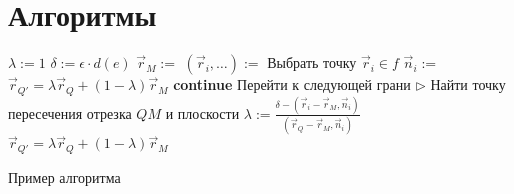 \chapter{Алгоритмы}

\begin{algorithm}[ht!]
\centering
\begin{algorithmic}[1]
\State $\lambda := 1$
\State $\delta := \epsilon \cdot d(e)$
\State $\vec r_M := $ 
\State $(\vec r_i, \dots) := $ 
\Comment Выбрать точку $\vec r_i \in f$
\State $\vec n_i := $ 
\State $\vec r_{Q'} = \lambda \vec r_Q + (1 - \lambda) \vec r_{M}$
\State \textbf{continue} \Comment Перейти к следующей грани
\Else
\State $\triangleright$ Найти точку пересечения отрезка $QM$ и плоскости
\State $\lambda := \frac{\delta - (\vec r_i - \vec r_M, \vec n_i)}
{(\vec r_Q - \vec r_M, \vec n_i)}$
\EndIf
\EndFor
\State $\vec r_{Q'} = \lambda \vec r_Q + (1 - \lambda) \vec r_{M}$
\State{}
\EndFunction
\end{algorithmic}
\caption{Пример алгоритма}
\label{alg:shift}
\end{algorithm}